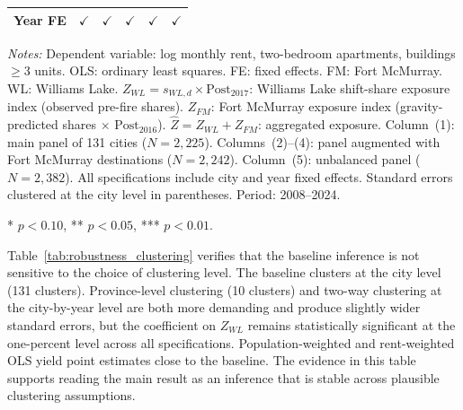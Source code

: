 \documentclass[12pt]{article}
\begin{document}
\begin{table}[!htbp]
{\begin{threeparttable}
\begin{tabular}{lrrrrr}
      Year FE            & $\checkmark$  & $\checkmark$ & $\checkmark$ & $\checkmark$  & $\checkmark$ \\
      \bottomrule
   \end{tabular}
   \begin{tablenotes}[flushleft]
      \footnotesize
      \item \textit{Notes:} Dependent variable: log monthly rent, two-bedroom apartments,
      buildings $\geq 3$ units. OLS: ordinary least squares. FE: fixed effects. FM: Fort McMurray. WL: Williams Lake.
      $Z_{WL} = s_{WL,d} \times \mathrm{Post}_{2017}$: Williams Lake
      shift-share exposure index (observed pre-fire shares).
      $Z_{FM}$: Fort McMurray exposure index (gravity-predicted shares
      $\times$ $\mathrm{Post}_{2016}$).
      $\hat{Z} = Z_{WL} + Z_{FM}$: aggregated exposure.
      Column~(1): main panel of 131 cities ($N=2{,}225$).
      Columns~(2)--(4): panel augmented with Fort McMurray destinations
      ($N=2{,}242$). Column~(5): unbalanced panel ($N=2{,}382$).
      All specifications include city and year fixed effects.
      Standard errors clustered at the city level in parentheses.
      Period: 2008--2024.

      * $p < 0.10$, ** $p < 0.05$, *** $p < 0.01$.
   \end{tablenotes}
   \end{threeparttable}}
\end{table}

Table~\ref{tab:robustness_clustering} verifies that the baseline inference is not sensitive to the choice of clustering level. The baseline clusters at the city level (131 clusters). Province-level clustering (10 clusters) and two-way clustering at the city-by-year level are both more demanding and produce slightly wider standard errors, but the coefficient on $Z_{WL}$ remains statistically significant at the one-percent level across all specifications. Population-weighted and rent-weighted OLS yield point estimates close to the baseline. The evidence in this table supports reading the main result as an inference that is stable across plausible clustering assumptions.
\end{document}
